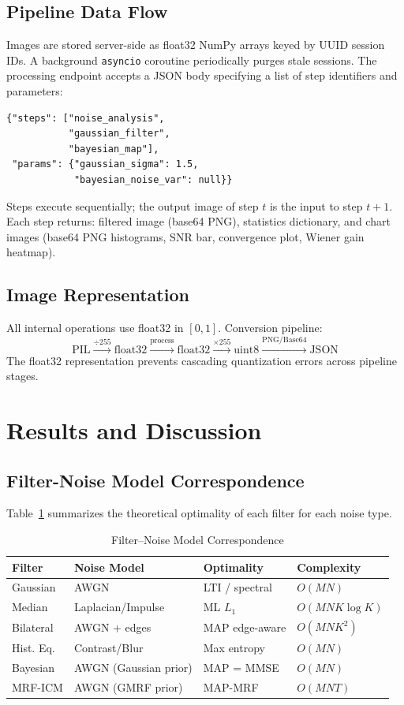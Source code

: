 \documentclass[10pt,conference]{IEEEtran}
\begin{document}
\subsection{Pipeline Data Flow}
Images are stored server-side as float32 NumPy arrays keyed by UUID session IDs. A background \texttt{asyncio} coroutine periodically purges stale sessions. The processing endpoint accepts a JSON body specifying a list of step identifiers and parameters:
\begin{verbatim}
{"steps": ["noise_analysis",
           "gaussian_filter",
           "bayesian_map"],
 "params": {"gaussian_sigma": 1.5,
            "bayesian_noise_var": null}}
\end{verbatim}
Steps execute sequentially; the output image of step $t$ is the input to step $t+1$. Each step returns: filtered image (base64 PNG), statistics dictionary, and chart images (base64 PNG histograms, SNR bar, convergence plot, Wiener gain heatmap).

\subsection{Image Representation}
All internal operations use float32 in $[0,1]$. Conversion pipeline:
\begin{equation}
\text{PIL} \xrightarrow{\div 255} \text{float32} \xrightarrow{\text{process}} \text{float32} \xrightarrow{\times 255} \text{uint8} \xrightarrow{\text{PNG/Base64}} \text{JSON}
\end{equation}
The float32 representation prevents cascading quantization errors across pipeline stages.

\section{Results and Discussion}

\subsection{Filter-Noise Model Correspondence}
Table~\ref{tab:correspondence} summarizes the theoretical optimality of each filter for each noise type.

\begin{table}[h]
\caption{Filter--Noise Model Correspondence}
\label{tab:correspondence}
\centering
\begin{tabular}{@{}llll@{}}
\toprule
\textbf{Filter} & \textbf{Noise Model} & \textbf{Optimality} & \textbf{Complexity} \\
\midrule
Gaussian   & AWGN & LTI / spectral & $O(MN)$ \\
Median     & Laplacian/Impulse & ML $L_1$ & $O(MNK\log K)$ \\
Bilateral  & AWGN + edges & MAP edge-aware & $O(MNK^2)$ \\
Hist. Eq.  & Contrast/Blur & Max entropy & $O(MN)$ \\
Bayesian   & AWGN (Gaussian prior) & MAP = MMSE & $O(MN)$ \\
MRF-ICM    & AWGN (GMRF prior) & MAP-MRF & $O(MNT)$ \\
\bottomrule
\end{tabular}
\end{table}
\end{document}

